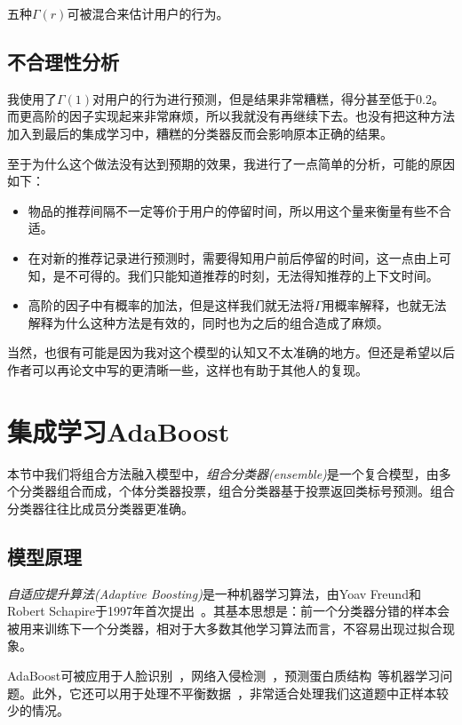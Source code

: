 \documentclass[12pt]{article} %
\begin{document}
\begin{sloppypar}
五种$\Gamma(r)$可被混合来估计用户的行为。

\subsection{不合理性分析}

我使用了$\Gamma(1)$对用户的行为进行预测，但是结果非常糟糕，得分甚至低于$0.2$。而更高阶的因子实现起来非常麻烦，所以我就没有再继续下去。也没有把这种方法加入到最后的集成学习中，糟糕的分类器反而会影响原本正确的结果。

至于为什么这个做法没有达到预期的效果，我进行了一点简单的分析，可能的原因如下：
\begin{itemize}
\item 物品的推荐间隔不一定等价于用户的停留时间，所以用这个量来衡量有些不合适。
\item 在对新的推荐记录进行预测时，需要得知用户前后停留的时间，这一点由上可知，是不可得的。我们只能知道推荐的时刻，无法得知推荐的上下文时间。
\item 高阶的因子中有概率的加法，但是这样我们就无法将$\Gamma$用概率解释，也就无法解释为什么这种方法是有效的，同时也为之后的组合造成了麻烦。
\end{itemize}

当然，也很有可能是因为我对这个模型的认知又不太准确的地方。但还是希望以后作者可以再论文中写的更清晰一些，这样也有助于其他人的复现。


\section{集成学习AdaBoost}

本节中我们将组合方法融入模型中，{\em 组合分类器(ensemble)}是一个复合模型，由多个分类器组合而成，个体分类器投票，组合分类器基于投票返回类标号预测。组合分类器往往比成员分类器更准确。

\subsection{模型原理}

{\em 自适应提升算法(Adaptive Boosting)}是一种机器学习算法，由Yoav Freund和Robert Schapire于1997年首次提出~\cite{freund1997decision}。其基本思想是：前一个分类器分错的样本会被用来训练下一个分类器，相对于大多数其他学习算法而言，不容易出现过拟合现象。

AdaBoost可被应用于人脸识别~\cite{wu2004fast}，网络入侵检测~\cite{hu2008adaboost}，预测蛋白质结构~\cite{niu2006predicting}等机器学习问题。此外，它还可以用于处理不平衡数据~\cite{viola2002fast}，非常适合处理我们这道题中正样本较少的情况。


\end{sloppypar}
\end{document}
